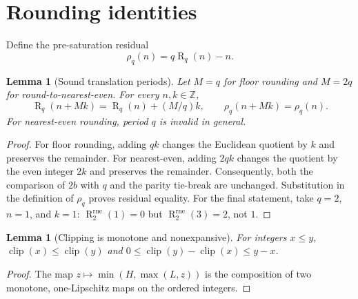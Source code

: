 \documentclass[11pt]{article}
\newtheorem{lemma}[definition]{Lemma}
\newcommand{\Z}{\mathbb Z}
\newcommand{\clip}{\operatorname{clip}}
\newcommand{\R}{\operatorname{R}}
\begin{document}
\section{Rounding identities}
Define the pre-saturation residual
\[
 \rho_q(n)=q\R_q(n)-n.
\]

\begin{lemma}[Sound translation periods]\label{lem:translation}
Let $M=q$ for floor rounding and $M=2q$ for round-to-nearest-even. For every $n,k\in\Z$,
\[
 \R_q(n+Mk)=\R_q(n)+(M/q)k,
 \qquad \rho_q(n+Mk)=\rho_q(n).
\]
For nearest-even rounding, period $q$ is invalid in general.
\end{lemma}
\begin{proof}
For floor rounding, adding $qk$ changes the Euclidean quotient by $k$ and preserves the remainder. For nearest-even, adding $2qk$ changes the quotient by the even integer $2k$ and preserves the remainder. Consequently, both the comparison of $2b$ with $q$ and the parity tie-break are unchanged. Substitution in the definition of $\rho_q$ proves residual equality. For the final statement, take $q=2$, $n=1$, and $k=1$: $\R_2^{\mathrm{rne}}(1)=0$ but $\R_2^{\mathrm{rne}}(3)=2$, not $1$.
\end{proof}

\begin{lemma}[Clipping is monotone and nonexpansive]\label{lem:clip}
For integers $x\le y$, $\clip(x)\le\clip(y)$ and
$0\le\clip(y)-\clip(x)\le y-x$.
\end{lemma}
\begin{proof}
The map $z\mapsto\min(H,\max(L,z))$ is the composition of two monotone, one-Lipschitz maps on the ordered integers.
\end{proof}
\end{document}
